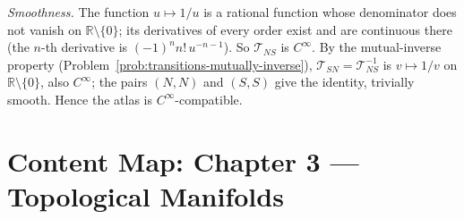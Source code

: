 \documentclass[11pt]{article}
\begin{document}
\emph{Smoothness.} The function $u\mapsto1/u$ is a rational function whose denominator does not vanish on $\mathbb R\setminus\{0\}$; its derivatives of every order exist and are continuous there (the $n$-th derivative is $(-1)^nn!\,u^{-n-1}$). So $\mathcal T_{NS}$ is $C^\infty$. By the mutual-inverse property (Problem~\ref{prob:transitions-mutually-inverse}), $\mathcal T_{SN}=\mathcal T_{NS}^{-1}$ is $v\mapsto1/v$ on $\mathbb R\setminus\{0\}$, also $C^\infty$; the pairs $(N,N)$ and $(S,S)$ give the identity, trivially smooth. Hence the atlas is $C^\infty$-compatible.

\clearpage
\section*{Content Map: Chapter 3 --- Topological Manifolds}
\end{document}
